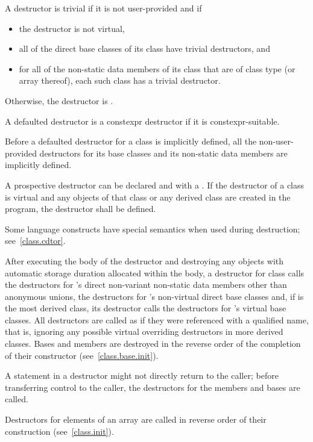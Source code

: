 \pnum
A destructor is trivial if it is not user-provided and if
\begin{itemize}
\item the destructor is not virtual,

\item all of the direct base classes of its class have trivial destructors, and

\item for all of the non-static data members of its class that are of class
type (or array thereof), each such class has a trivial destructor.
\end{itemize}

Otherwise, the destructor is
.

\pnum
A defaulted destructor is a constexpr destructor
if it is constexpr-suitable.

\pnum
Before a
defaulted destructor for a class is implicitly defined, all the non-user-provided
destructors for its base classes and its non-static data members are
implicitly defined.

\pnum
{}%
%
A prospective destructor can be
declared 
and with a .
If the destructor of a class is virtual and
any objects of that class or any derived class are created in the program,
the destructor shall be defined.

\pnum
\begin{note}
%
Some language constructs have special semantics when used during destruction;
see~\ref{class.cdtor}.
\end{note}

\pnum
{}%
%
%
After executing the body of the destructor and destroying
any objects with automatic storage duration allocated within the body, a
destructor for class
calls the destructors for
's
direct non-variant non-static data members other than anonymous unions,
the destructors for
's
non-virtual direct base classes and, if
is the most derived class,
its destructor calls the destructors for
's
virtual base classes.
All destructors are called as if they were referenced with a qualified name,
that is, ignoring any possible virtual overriding destructors in more
derived classes.
Bases and members are destroyed in the reverse order of the completion of
their constructor (see~\ref{class.base.init}).
\begin{note}
A
statement in a destructor might not directly return to the
caller; before transferring control to the caller, the destructors for the
members and bases are called.
\end{note}
%
Destructors for elements of an array are called in reverse order of their
construction (see~\ref{class.init}).

